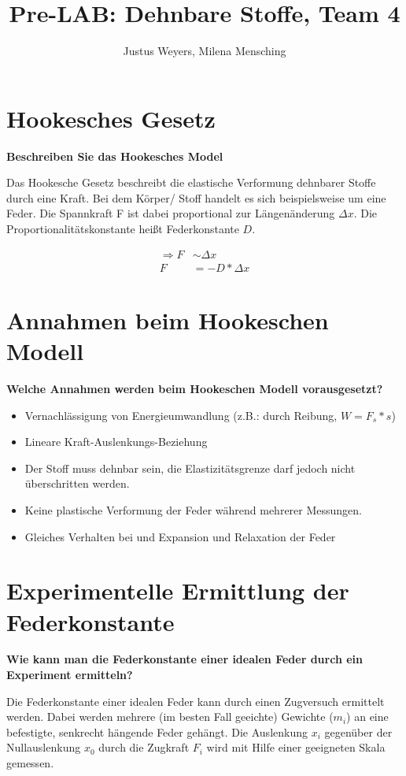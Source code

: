 \documentclass[a4paper, 12pt]{article}
\title{Pre-LAB: Dehnbare Stoffe, Team 4}
\author{Justus Weyers, Milena Mensching}
\begin{document}
\maketitle
\section{Hookesches Gesetz}
\textbf{Beschreiben Sie das Hookesches Model}

Das Hookesche Gesetz beschreibt die elastische Verformung dehnbarer Stoffe durch eine Kraft. Bei dem Körper/ Stoff handelt es sich beispielsweise um eine Feder. Die Spannkraft F ist dabei proportional zur Längenänderung $\Delta x$. Die Proportionalitätskonstante heißt Federkonstante $D$.

\begin{equation}
\begin{split}
\Rightarrow F&\sim\Delta x\\
 F&= -D*\Delta x
\end{split}
\end{equation}


\section{Annahmen beim Hookeschen Modell}
\textbf{Welche Annahmen werden beim Hookeschen Modell vorausgesetzt?}

\begin{itemize}
\item{Vernachlässigung von Energieumwandlung (z.B.: durch Reibung, $W=F_s*s$)}
\item{Lineare Kraft-Auslenkungs-Beziehung}
\item{Der Stoff muss dehnbar sein, die Elastizitätsgrenze darf jedoch nicht überschritten werden.}
\item{Keine plastische Verformung der Feder während mehrerer Messungen.}
\item{Gleiches Verhalten bei und Expansion und Relaxation der Feder}
\end{itemize}

\section{Experimentelle Ermittlung der Federkonstante}
\textbf{Wie kann man die Federkonstante einer idealen Feder durch ein Experiment ermitteln?}

Die Federkonstante einer idealen Feder kann durch einen Zugversuch ermittelt werden. Dabei werden mehrere (im besten Fall geeichte) Gewichte ($m_{i}$) an eine befestigte, senkrecht hängende Feder gehängt. Die Auslenkung $x_i$ gegenüber der Nullauslenkung $x_0$ durch die Zugkraft $F_i$ wird mit Hilfe einer geeigneten Skala gemessen.
\end{document}
